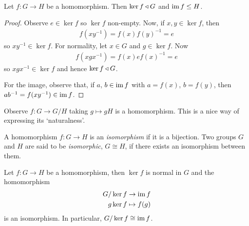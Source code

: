 \documentclass{../template/note}
\begin{document}
    \begin{proposition}
        Let $f: G \to H$ be a homomorphism. Then $\ker f \triangleleft G$ and $\operatorname{im} f \leq H$.
    \end{proposition}
    
    \begin{proof}
        Observe $e \in \ker f$ so $\ker f$ non-empty. Now, if $x, y \in \ker f$, then
        \begin{align*}
            f(xy^{-1}) = f(x)f(y)^{-1} = e
        \end{align*}
        so $xy^{-1} \in \ker f$. For normality, let $x \in G$ and $g \in \ker f$. Now
        \begin{align*}
            f(xgx^{-1}) = f(x) e f(x)^{-1} = e
        \end{align*}
        so $xgx^{-1} \in \ker f$ and hence $\ker f \triangleleft G$.
        
        For the image, observe that, if $a$, $b \in \operatorname{im} f$ with $a = f(x)$, $b = f(y)$, then $ab^{-1} = f(xy^{-1}) \in \operatorname{im} f$.
    \end{proof}
    
    \begin{remark*}
        Observe $f: G \to G/H$ taking $g \mapsto gH$ is a homomorphism. This is a nice way of expressing its `naturalness'.
    \end{remark*}
    
    \begin{definition}
        A homomorphism $f: G \to H$ is an \emph{isomorphism} if it is a bijection. Two groups $G$ and $H$ are said to be \emph{isomorphic}, $G \cong H$, if there exists an isomorphism between them.
    \end{definition}
    
    \begin{theorem}
        Let $f: G \to H$ be a homomorphism, then $\ker f$ is normal in $G$ and the homomorphism
        \begin{align*}
            G/\ker f &\to \operatorname{im} f \\
            g \ker f &\mapsto f(g)
        \end{align*}
        is an isomorphism. In particular, $G/\ker f \cong \operatorname{im} f$.                
    \end{theorem}
    
\end{document}
